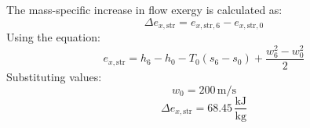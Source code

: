 The mass-specific increase in flow exergy is calculated as:  
\[
\Delta e_{x,\text{str}} = e_{x,\text{str},6} - e_{x,\text{str},0}
\]  
Using the equation:  
\[
e_{x,\text{str}} = h_6 - h_0 - T_0 (s_6 - s_0) + \frac{w_6^2 - w_0^2}{2}
\]  
Substituting values:  
\[
w_0 = 200 \, \text{m/s}
\]  
\[
\Delta e_{x,\text{str}} = 68.45 \, \frac{\text{kJ}}{\text{kg}}
\]